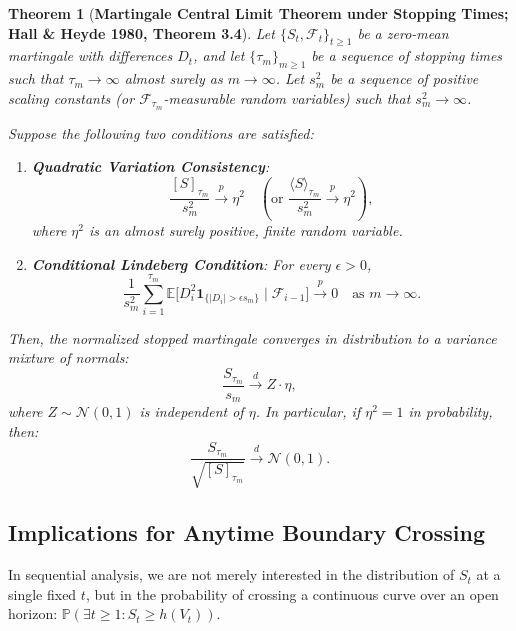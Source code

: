 \documentclass[11pt,a4paper]{article}
\newtheorem{theorem}{Theorem}
\begin{document}
\begin{theorem}[\textbf{Martingale Central Limit Theorem under Stopping Times; Hall \& Heyde 1980, Theorem 3.4}]\label{thm:mclt}
Let $\{S_{t}, \mathcal{F}_{t}\}_{t \ge 1}$ be a zero-mean martingale with differences $D_t$, and let $\{\tau_m\}_{m \ge 1}$ be a sequence of stopping times such that $\tau_m \to \infty$ almost surely as $m \to \infty$. Let $s_m^2$ be a sequence of positive scaling constants (or $\mathcal{F}_{\tau_m}$-measurable random variables) such that $s_m^2 \to \infty$. 

Suppose the following two conditions are satisfied:
\begin{enumerate}[label=(\alph*)]
    \item \textbf{Quadratic Variation Consistency}:
    \begin{equation}\label{eq:cond_quad_var}
    \frac{[S]_{\tau_m}}{s_m^2} \xrightarrow{p} \eta^2 \quad (\text{or } \frac{\langle S \rangle_{\tau_m}}{s_m^2} \xrightarrow{p} \eta^2),
    \end{equation}
    where $\eta^2$ is an almost surely positive, finite random variable.
    \item \textbf{Conditional Lindeberg Condition}: For every $\epsilon > 0$,
    \begin{equation}\label{eq:cond_lindeberg}
    \frac{1}{s_m^2} \sum_{i=1}^{\tau_m} \mathbb{E}\Big[ D_i^2 \mathbf{1}_{\{|D_i| > \epsilon s_m\}} \;\Big|\; \mathcal{F}_{i-1} \Big] \xrightarrow{p} 0 \quad \text{as } m \to \infty.
    \end{equation}
\end{enumerate}
Then, the normalized stopped martingale converges in distribution to a variance mixture of normals:
\begin{equation}
\frac{S_{\tau_m}}{s_m} \xrightarrow{d} Z \cdot \eta,
\end{equation}
where $Z \sim \mathcal{N}(0, 1)$ is independent of $\eta$. In particular, if $\eta^2 = 1$ in probability, then:
\begin{equation}
\frac{S_{\tau_m}}{\sqrt{[S]_{\tau_m}}} \xrightarrow{d} \mathcal{N}(0, 1).
\end{equation}
\end{theorem}

\subsection{Implications for Anytime Boundary Crossing}
In sequential analysis, we are not merely interested in the distribution of $S_t$ at a single fixed $t$, but in the probability of crossing a continuous curve over an open horizon: $\mathbb{P}(\exists t \ge 1 : S_t \ge h(V_t))$. 
\end{document}
